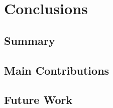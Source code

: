 \chapter{Conclusions}  \label{chap:conclusion}

\section{Summary}

\section{Main Contributions}

\section{Future Work}